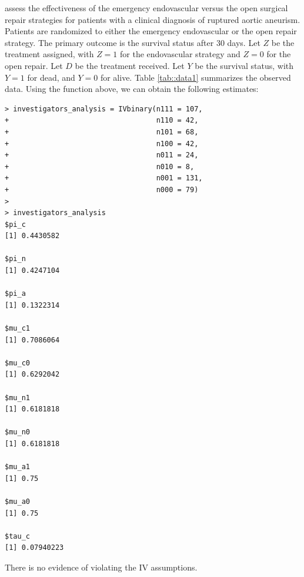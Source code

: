 \begin{example}\label{eg::1-iv-inequalities}
\citet{improve2014endovascular} assess the effectiveness of the emergency endovascular versus the open surgical repair strategies for patients with a clinical diagnosis of ruptured aortic aneurism. Patients are randomized to either the emergency endovascular or the open repair strategy. The primary outcome is the survival status after 30 days. Let $Z$ be the treatment assigned, with $Z=1$ for the endovascular strategy and $Z=0$ for the open repair. Let $D$ be the treatment received. 
Let $Y$ be the survival status, with $Y=1$ for dead, and $Y=0$ for alive. Table \ref{tab::data1} summarizes the observed data.
Using the  function above, we can obtain the following estimates:
\begin{lstlisting}
> investigators_analysis = IVbinary(n111 = 107,
+                                   n110 = 42,
+                                   n101 = 68,
+                                   n100 = 42,
+                                   n011 = 24,
+                                   n010 = 8,
+                                   n001 = 131,
+                                   n000 = 79)
>                         
> investigators_analysis
$pi_c
[1] 0.4430582

$pi_n
[1] 0.4247104

$pi_a
[1] 0.1322314

$mu_c1
[1] 0.7086064

$mu_c0
[1] 0.6292042

$mu_n1
[1] 0.6181818

$mu_n0
[1] 0.6181818

$mu_a1
[1] 0.75

$mu_a0
[1] 0.75

$tau_c
[1] 0.07940223
\end{lstlisting}
There is no evidence of violating the IV assumptions. 
\end{example}


